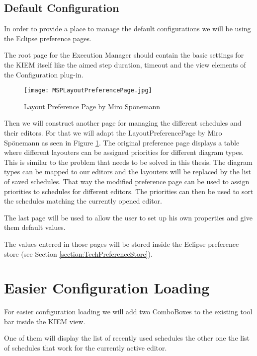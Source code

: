 \subsection{Default Configuration}
\label{section:ConfConceptsDefaultConf}
In order to provide a place to manage the default configurations we will be
using the Eclipse preference pages.

The root page for the Execution Manager should contain the basic settings for the \ac{KIEM} itself like
the aimed step duration, timeout and the view elements of the Configuration plug-in.

\begin{figure}[H]
  \centering
  \texttt{[image: MSPLayoutPreferencePage.jpg]}
  \caption[Layout Preference Page by Miro Sp\"onemann]%
  {Layout Preference Page by Miro Sp\"onemann\protect}
  \label{fig:MSPLayoutPreferencePage}
\end{figure}

Then we will construct another page for managing the different schedules
and their editors. For that we will adapt the LayoutPreferencePage by Miro Sp\"onemann
as seen in Figure \ref{fig:MSPLayoutPreferencePage}. The original preference page
displays a table where different layouters can be assigned priorities for different diagram
types. This is similar to the problem that needs to be solved in this thesis. The diagram types
can be mapped to our editors and the layouters will be replaced by the list of saved schedules.
That way the modified preference page can be used to assign priorities to schedules for
different editors. The priorities can then be used to sort the schedules matching
the currently opened editor.

The last page will be used to allow the user to set up his own properties and give them
default values.

The values entered in those pages will be stored inside the Eclipse preference
store (see Section \ref{section:TechPreferenceStore}).

\section{Easier Configuration Loading}
\label{section:ConfConceptsEasyLoading}
For easier configuration loading we will add two ComboBoxes to the existing
tool bar inside the \ac{KIEM} view.

One of them will display the list of recently used schedules the other one the
list of schedules that work for the currently active editor.

